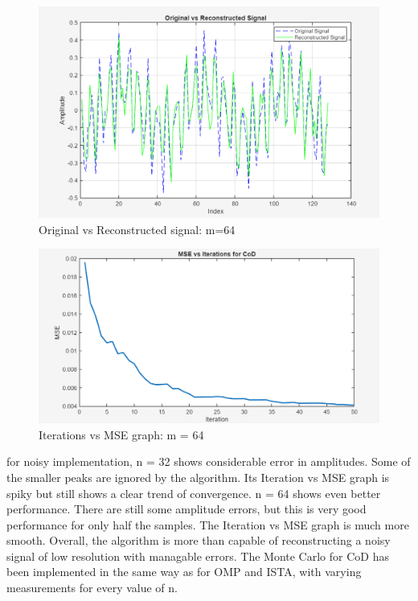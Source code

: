 \documentclass[
  letterpaper,
  DIV=11,
  numbers=noendperiod]{scrartcl}
\begin{document}
\begin{figure}[H]

{\centering \includegraphics[width=0.8\linewidth,height=\textheight,keepaspectratio]{abar-cs_files/mediabag/cod_m64_noisy1.png}

}

\caption{Original vs Reconstructed signal: m=64}

\end{figure}%

\begin{figure}[H]

{\centering \includegraphics[width=0.8\linewidth,height=\textheight,keepaspectratio]{abar-cs_files/mediabag/cod_m64_noisy_mse.png}

}

\caption{Iterations vs MSE graph: m = 64}

\end{figure}%

for noisy implementation, n = 32 shows considerable error in amplitudes.
Some of the smaller peaks are ignored by the algorithm. Its Iteration vs
MSE graph is spiky but still shows a clear trend of convergence. n = 64
shows even better performance. There are still some amplitude errors,
but this is very good performance for only half the samples. The
Iteration vs MSE graph is much more smooth. Overall, the algorithm is
more than capable of reconstructing a noisy signal of low resolution
with managable errors. The Monte Carlo for CoD has been implemented in
the same way as for OMP and ISTA, with varying measurements for every
value of n.
\end{document}
